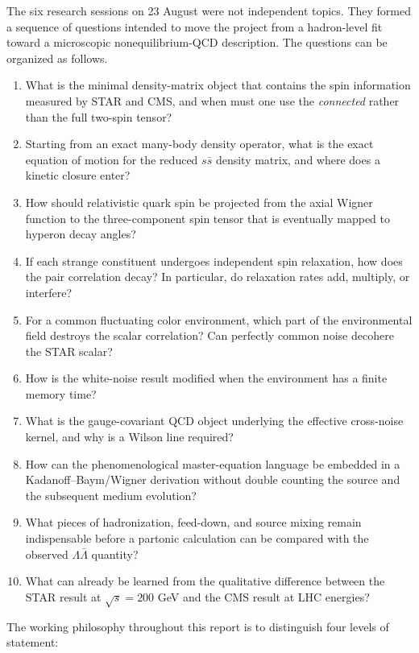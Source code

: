 \documentclass[11pt]{article}
\begin{document}
The six research sessions on 23 August were not independent topics. They formed a sequence of questions intended to move the project from a hadron-level fit toward a microscopic nonequilibrium-QCD description. The questions can be organized as follows.

\begin{enumerate}[leftmargin=1.7em]
\item What is the minimal density-matrix object that contains the spin information measured by STAR and CMS, and when must one use the \emph{connected} rather than the full two-spin tensor?
\item Starting from an exact many-body density operator, what is the exact equation of motion for the reduced $s\bar s$ density matrix, and where does a kinetic closure enter?
\item How should relativistic quark spin be projected from the axial Wigner function to the three-component spin tensor that is eventually mapped to hyperon decay angles?
\item If each strange constituent undergoes independent spin relaxation, how does the pair correlation decay? In particular, do relaxation rates add, multiply, or interfere?
\item For a common fluctuating color environment, which part of the environmental field destroys the scalar correlation? Can perfectly common noise decohere the STAR scalar?
\item How is the white-noise result modified when the environment has a finite memory time?
\item What is the gauge-covariant QCD object underlying the effective cross-noise kernel, and why is a Wilson line required?
\item How can the phenomenological master-equation language be embedded in a Kadanoff--Baym/Wigner derivation without double counting the source and the subsequent medium evolution?
\item What pieces of hadronization, feed-down, and source mixing remain indispensable before a partonic calculation can be compared with the observed $\Lambda\bar\Lambda$ quantity?
\item What can already be learned from the qualitative difference between the STAR result at $\sqrt{s}=200$ GeV and the CMS result at LHC energies?
\end{enumerate}

The working philosophy throughout this report is to distinguish four levels of statement:
\end{document}
